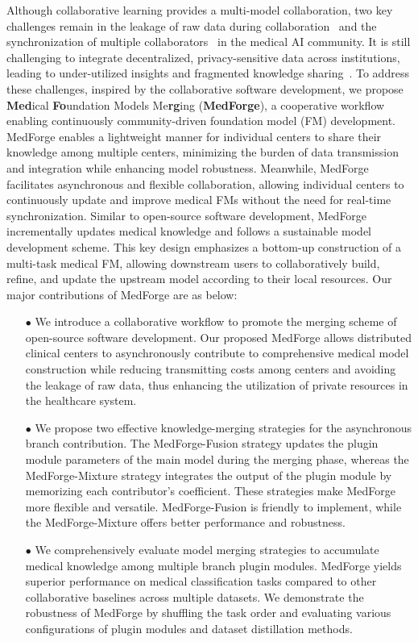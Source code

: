 Although collaborative learning provides a multi-model collaboration, two key challenges remain in the leakage of raw data during collaboration~\cite{huang2023lorahub} and the synchronization of multiple collaborators~\cite{mcmahan2017communication} in the medical AI community. It is still challenging to integrate decentralized, privacy-sensitive data across institutions, leading to under-utilized insights and fragmented knowledge sharing~\cite{kaissis2020secure, rajpurkar2022ai, abdullah2021ethics}.
 To address these challenges, inspired by the collaborative software development, we propose \textbf{Med}ical \textbf{Fo}undation Models Me\textbf{rg}ing (\textbf{MedForge}), a cooperative workflow enabling continuously community-driven foundation model (FM) development.
MedForge enables a lightweight manner for individual centers to share their knowledge among multiple centers, minimizing the burden of data transmission and integration while enhancing model robustness.
Meanwhile, MedForge facilitates asynchronous and flexible collaboration, allowing individual centers to continuously update and improve medical FMs without the need for real-time synchronization.
Similar to open-source software development, MedForge incrementally updates medical knowledge and follows a sustainable model development scheme. 
This key design emphasizes a bottom-up construction of a multi-task medical FM, allowing downstream users to collaboratively build, refine, and update the upstream model according to their local resources. Our major contributions of MedForge are as below: 
\begin{enumerate}
    \item[$\bullet$] We introduce a collaborative workflow to promote the merging scheme of open-source software development. Our proposed MedForge allows distributed clinical centers to asynchronously contribute to comprehensive medical model construction while reducing transmitting costs among centers and avoiding the leakage of raw data, thus enhancing the utilization of private resources in the healthcare system. 
    \item[$\bullet$] We propose two effective knowledge-merging strategies for the asynchronous branch contribution. The MedForge-Fusion strategy updates the plugin module parameters of the main model during the merging phase, whereas the MedForge-Mixture strategy integrates the output of the plugin module by memorizing each contributor's coefficient. These strategies make MedForge more flexible and versatile. MedForge-Fusion is friendly to implement, while the MedForge-Mixture offers better performance and robustness.
    \item[$\bullet$]  We comprehensively evaluate model merging strategies to accumulate medical knowledge among multiple branch plugin modules. MedForge yields superior performance on medical classification tasks compared to other collaborative baselines across multiple datasets. We demonstrate the robustness of MedForge by shuffling the task order and evaluating various configurations of plugin modules and dataset distillation methods.
\end{enumerate}


